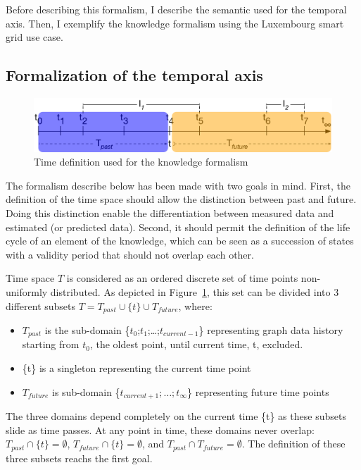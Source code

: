 Before describing this formalism, I describe the semantic used for the temporal axis.
Then, I exemplify the knowledge formalism using the Luxembourg smart grid use case.

\subsection{Formalization of the temporal axis}
\label{sec:tkm:timeDef}

\begin{figure}
   \centering
	\includegraphics[width=\textwidth]{img/chapt-tkm/formalismeTime}
	\caption{Time definition used for the knowledge formalism}
	\label{fig:tkm:formalismeTime}
\end{figure}

The formalism describe below has been made with two goals in mind.
First, the definition of the time space should allow the distinction between past and future. 
Doing this distinction enable the differentiation between measured data and estimated (or predicted data).
Second, it should permit the definition of the life cycle of an element of the \gls{knowledge}, which can be seen as a succession of states with a validity period that should not overlap each other.

Time space $T$ is considered as an ordered discrete set of time points non-uniformly distributed. 
As depicted in Figure~\ref{fig:tkm:formalismeTime}, this set can be divided into 3 different subsets $T = T_{past} \cup \{t\} \cup T_{future}$, where:  
\begin{itemize}
	\vspace{-0.5em}
	\setlength\itemsep{-0.3em}
	\item $T_{past}$ is the sub-domain \{$t_{0}$;$t_{1}$;\ldots;$t_{current-1}$\}  representing graph data history starting from $t_0$, the oldest point, until current time, t, excluded.
	\item \{t\} is a singleton representing the current time 
point
	\item $T_{future}$ is sub-domain \{$t_{current+1};\ldots;t_{\infty}$\} representing future time points 
\end{itemize}
The three domains depend completely on the current time \{t\} as these subsets slide as time passes. 
At any point in time, these domains never overlap: $T_{past} \cap \{t\} = \emptyset$, $T_{future} \cap \{t\} =  \emptyset$, and $T_{past} \cap T_{future} = \emptyset$.
The definition of these three subsets reachs the first goal.

